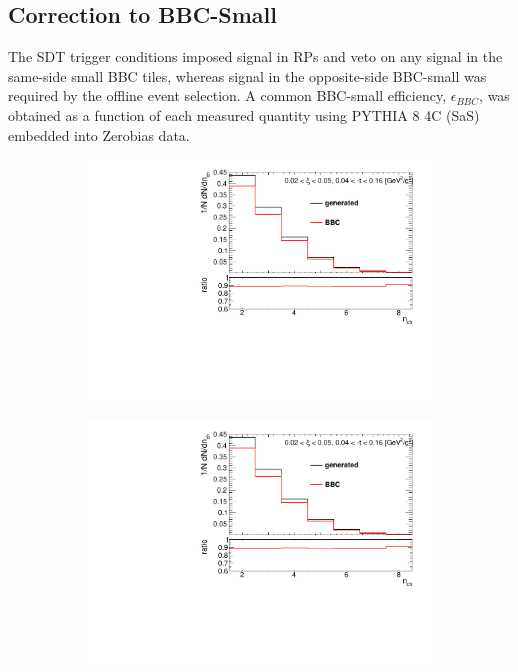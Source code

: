 \subsection{Correction to BBC-Small }\label{section:star_bbc}
The SDT trigger conditions imposed signal in RPs and veto on any signal in the same-side small BBC tiles, whereas signal in the opposite-side BBC-small was required by the offline event selection. A common BBC-small efficiency, $\epsilon_{BBC}$, was obtained as a function of each measured quantity using  PYTHIA 8 4C (SaS) embedded into Zerobias data. 

\captionsetup{format=plain,indention=0pt,justification=justified}
\begin{figure}[h!]
	\centering
	\begin{subfigure}{.45\textwidth}
		\includegraphics[width=\textwidth,page=1]{chapters/chrgSTAR/img/bbcCorrection/xi_bbc.pdf}
	\end{subfigure}
	\begin{subfigure}{.45\textwidth}
		\includegraphics[width=\textwidth,page=2]{chapters/chrgSTAR/img/bbcCorrection/xi_bbc.pdf}

\end{subfigure}
\end{figure}
